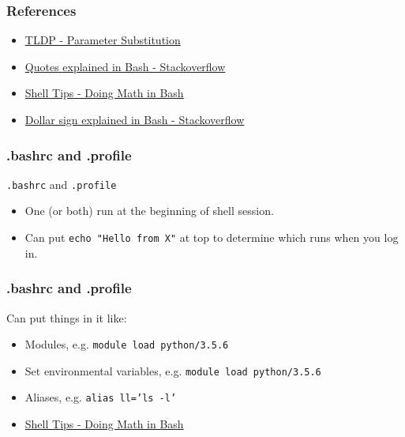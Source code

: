 \documentclass{beamer}
\newcommand{\code}[1]{\colorbox{codegray}{\texttt{#1}}}
\begin{document}
\begin{frame}
\frametitle{References}
\begin{itemize}
    \item \href{https://tldp.org/LDP/abs/html/parameter-substitution.html}{TLDP - Parameter Substitution}
    \bigskip
    \item \href{https://stackoverflow.com/questions/6697753/difference-between-single-and-double-quotes-in-bash}{Quotes explained in Bash - Stackoverflow}
    \bigskip
    \item \href{https://www.shell-tips.com/bash/math-arithmetic-calculation/}{Shell Tips - Doing Math in Bash}
    \bigskip
    \item \href{https://stackoverflow.com/a/5163260/4021436}{Dollar sign explained in Bash - Stackoverflow}
\end{itemize}
\end{frame}






\begin{frame}
\frametitle{.bashrc and .profile}
\code{.bashrc} and \code{.profile}
\bigskip
\begin{itemize}
    \item One (or both) run at the beginning of shell session.
    \bigskip
    \pause
    \item Can put \code{echo "Hello from X"} at top to determine which runs when you log in.
\end{itemize}
\end{frame}


\begin{frame}
\frametitle{.bashrc and .profile}
Can put things in it like:
\bigskip
\begin{itemize}
    \item Modules, e.g. \code{module load python/3.5.6}
    \bigskip
    \pause
    \item Set environmental variables, e.g. \code{module load python/3.5.6}
    \pause
    \bigskip
    \item Aliases, e.g. \code{alias ll='ls -l'}
    \pause
    \bigskip
    \item \href{https://www.shell-tips.com/bash/math-arithmetic-calculation/}{Shell Tips - Doing Math in Bash}
\end{itemize}
\end{frame}
\end{document}
